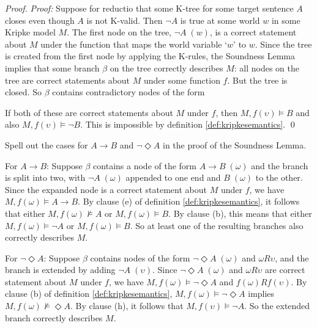\begin{proof}
  \emph{Proof:} Suppose for reductio that some K-tree for some target sentence
  $A$ closes even though $A$ is not K-valid. Then $\neg A$ is true at some world
  $w$ in some Kripke model $M$. The first node on the tree, $\neg A \; (w)$, is
  a correct statement about $M$ under the function that maps the world variable
  `$w$' to $w$. Since the tree is created from the first node by applying the
  K-rules, the Soundness Lemma implies that some branch $\beta$ on the tree
  correctly describes $M$: all nodes on the tree are correct statements about
  $M$ under some function $f$. But the tree is closed. So $\beta$ contains
  contradictory nodes of the form
  \begin{center}
  \end{center}
  If both of these are correct statements about $M$ under $f$, then
  $M,f(\upsilon) \models B$ and also $M,f(\upsilon) \models \neg B$. This is
  impossible by definition \ref{def:kripkesemantics}. \qed
\end{proof}

\begin{exercise}
  Spell out the cases for $A \to B$ and $\neg\Diamond A$ in the proof of the
  Soundness Lemma.
\end{exercise}
\begin{solution}
  For $A\to B$: Suppose $\beta$ contains a node of the form $A \to B \;(\omega)$
  and the branch is split into two, with $\neg A \;(\omega)$ appended to one end
  and $B \;(\omega)$ to the other. Since the expanded node is a correct
  statement about $M$ under $f$, we have $M,f(\omega) \models A \to B$. By
  clause (e) of definition \ref{def:kripkesemantics}, it follows that either
  $M,f(\omega) \not\models A$ or $M,f(\omega) \models B$. By clause (b), this
  means that either $M,f(\omega) \models \neg A$ or $M,f(\omega) \models B$. So
  at least one of the resulting branches also correctly describes $M$.

  For $\neg\Diamond A$: Suppose $\beta$ contains nodes of the form
  $\neg\Diamond A \;(\omega)$ and $\omega R \upsilon$, and the branch is
  extended by adding $\neg A \;(\upsilon)$. Since $\neg\Diamond A \;(\omega)$
  and $\omega R \upsilon$ are correct statement about $M$ under $f$, we have
  $M,f(\omega) \models \neg\Diamond A$ and $f(\omega)Rf(\upsilon)$. By clause
  (b) of definition \ref{def:kripkesemantics},
  $M,f(\omega) \models \neg\Diamond A$ implies
  $M,f(\omega) \not\models \Diamond A$. By clause (h), it follows that
  $M,f(\upsilon) \models \neg A$. So the extended branch correctly describes
  $M$.
\end{solution}

